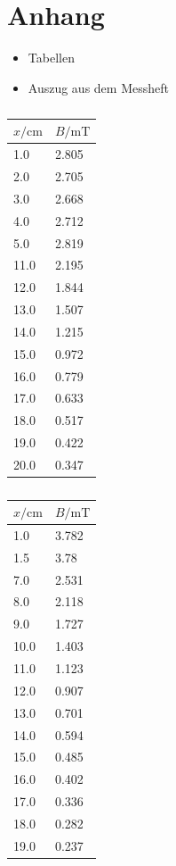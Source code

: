 \documentclass[11pt,ngerman,a4paper]{article}
\begin{document}
\section{Anhang}
\begin{itemize}
\item Tabellen
\item Auszug aus dem Messheft
\end{itemize}

\begin{table}
\centering
\begin{tabular}{ll}
\toprule
{$x / \si{\centi\meter}$} &{ $B/\si{\milli\tesla}$ }\\
\midrule
1.0 & 2.805\\
2.0 & 2.705\\
3.0 & 2.668\\
4.0 & 2.712\\
5.0 & 2.819\\
11.0 & 2.195\\
12.0 & 1.844\\
13.0 & 1.507\\
14.0 & 1.215\\
15.0 & 0.972\\
16.0 & 0.779\\
17.0 & 0.633\\
18.0 & 0.517\\
19.0 & 0.422\\
20.0 & 0.347\\
\bottomrule
\end{tabular}
\label{}
\caption{}
\end{table}

\begin{table}
\centering
\begin{tabular}{ll}
\toprule
{$x / \si{\centi\meter}$} &{ $B/\si{\milli\tesla}$ }\\
\midrule
1.0 & 3.782\\
1.5 & 3.78\\
7.0 & 2.531\\
8.0 & 2.118\\
9.0 & 1.727\\
10.0 & 1.403\\
11.0 & 1.123\\
12.0 & 0.907\\
13.0 & 0.701\\
14.0 & 0.594\\
15.0 & 0.485\\
16.0 & 0.402\\
17.0 & 0.336\\
18.0 & 0.282\\
19.0 & 0.237\\
\bottomrule
\end{tabular}
\label{}
\caption{}
\end{table}
\end{document}
